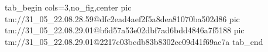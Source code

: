  
 
 
 
 

\qqSecOrig


\ifcmt
  tab_begin cols=3,no_fig,center
    pic tm://31_05_22.08.28.59@dfc2ead4aef2f5a8dea81070ba502d86
    pic tm://31_05_22.08.29.01@b6d57a53e02dbf7ad6bdd4846a7f5188
    pic tm://31_05_22.08.29.01@2217c03bcdb83b8302ec09d41f69ac7a
  tab_end
\fi

